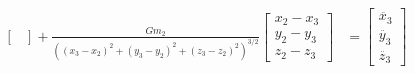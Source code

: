 \documentclass{beamer}
\begin{document}
\begin{frame}
\begin{align}
\begin{bmatrix}
        \end{bmatrix} + 
        \frac{G m_2}{((x_3 - x_2)^2 + (y_3 - y_2)^2 + (z_3 - z_2)^2)^{3/2}} 
        \begin{bmatrix}
            x_2 - x_3 \\
            y_2 - y_3 \\
            z_2 - z_3
        \end{bmatrix} &= \begin{bmatrix}
            \ddot{x_3} \\
            \ddot{y_3} \\ 
            \ddot{z_3}
        \end{bmatrix}
    \end{align}

\end{frame}
\end{document}
